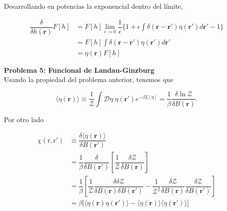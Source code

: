 \documentclass[10pt]{article}
\begin{document}
Desarrollando en potencias la exponencial dentro del l\'imite,

\begin{align*}
\dfrac{\delta}{\delta h(\mathbf{r})} F[h] 
&= F[h] \lim_{\epsilon\rightarrow 0} \dfrac{1}{\epsilon}  \bigg\lbrace 1+ \epsilon \int \delta(\mathbf{r} - \mathbf{r'})\eta(\mathbf{r'}) d\mathbf{r'} - 1\bigg\rbrace \\
&= F[h] \int \delta(\mathbf{r} - \mathbf{r'})\eta(\mathbf{r'}) d\mathbf{r'} \\
&= \eta(\mathbf{r}) F[h] 
\end{align*}

\pagebreak

\textbf{Problema 5: Funcional de Landau-Ginzburg}\\

Usando la propiedad del problema anterior, tenemos que 

\begin{equation}
\langle \eta(\mathbf{r})\rangle \equiv \dfrac{1}{\mathcal{Z}} \int \mathcal{D}\eta\; \eta(\mathbf{r'})  e^{-\beta L[\eta]} = \dfrac{1}{\beta} \dfrac{\delta \ln \mathcal{Z}}{\delta B(\mathbf{r})}.
\end{equation}

Por otro lado

\begin{align*}
\chi(\mathrm{r}, \mathrm{r'}) &\equiv \dfrac{\delta \langle \eta(\mathbf{r}) \rangle}{\delta B(\mathbf{r'})} \\
&= \dfrac{1}{\beta} \dfrac{\delta}{\delta B(\mathbf{r'})}\left[ \dfrac{1}{\mathcal{Z}} \dfrac{\delta \mathcal{Z}}{\delta B(\mathbf{r})} \right] \\
&= \dfrac{1}{\beta} \left[ \dfrac{1}{\mathcal{Z}} \dfrac{\delta \delta \mathcal{Z}}{\delta B(\mathbf{r}) \delta B(\mathbf{r'})} - \dfrac{1}{\mathcal{Z}^2} \dfrac{\delta \mathcal{Z}}{\delta B(\mathbf{r})} \dfrac{\delta \mathcal{Z}}{\delta B(\mathbf{r'})}  \right] \\
&= \beta \bigg[ \langle \eta(\mathbf{r})  \eta(\mathbf{r'}) \rangle - \langle  \eta(\mathbf{r}) \rangle \langle  \eta(\mathbf{r'}) \rangle \bigg] 
\end{align*}
\end{document}
